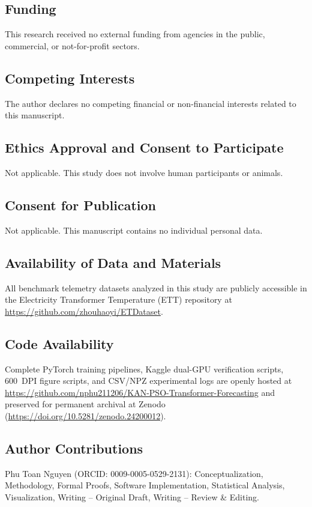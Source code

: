 \documentclass[pdflatex,sn-mathphys-num,referee,lineno]{sn-jnl}
\theoremstyle{thmstyleone}
\theoremstyle{thmstyletwo}
\theoremstyle{thmstylethree}
\begin{document}
\subsection*{Funding}
This research received no external funding from agencies in the public, commercial, or not-for-profit sectors.

\subsection*{Competing Interests}
The author declares no competing financial or non-financial interests related to this manuscript.

\subsection*{Ethics Approval and Consent to Participate}
Not applicable. This study does not involve human participants or animals.

\subsection*{Consent for Publication}
Not applicable. This manuscript contains no individual personal data.

\subsection*{Availability of Data and Materials}
All benchmark telemetry datasets analyzed in this study are publicly accessible in the Electricity Transformer Temperature (ETT) repository at \url{https://github.com/zhouhaoyi/ETDataset}.

\subsection*{Code Availability}
Complete PyTorch training pipelines, Kaggle dual-GPU verification scripts, 600~DPI figure scripts, and CSV/NPZ experimental logs are openly hosted at \url{https://github.com/nphu211206/KAN-PSO-Transformer-Forecasting} and preserved for permanent archival at Zenodo (\url{https://doi.org/10.5281/zenodo.24200012}).

\subsection*{Author Contributions}
Phu Toan Nguyen (ORCID: 0009-0005-0529-2131): Conceptualization, Methodology, Formal Proofs, Software Implementation, Statistical Analysis, Visualization, Writing -- Original Draft, Writing -- Review \& Editing.


\end{document}
